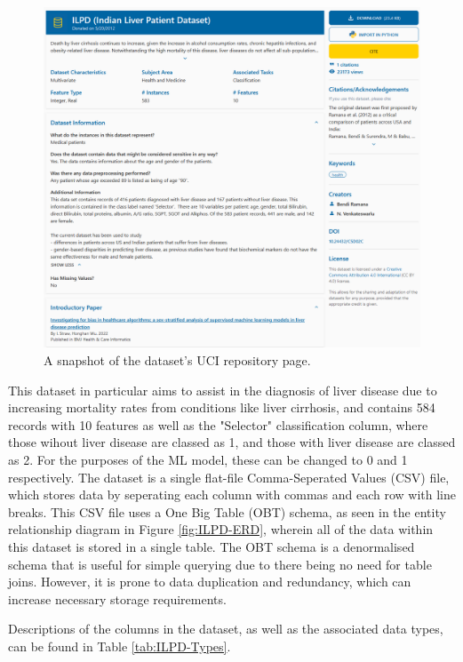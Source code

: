 \documentclass[12pt]{report}
\begin{document}
\begin{figure}[H]
    \centering
    \includegraphics[width=.75\linewidth]{ILPD-UCI.png}
    \caption{A snapshot of the dataset's UCI repository page.}
    \label{fig:ILPD-UCI}
\end{figure}

This dataset in particular aims to assist in the diagnosis of liver
disease due to increasing mortality rates from conditions like liver cirrhosis, and contains 584 records with 10 features
as well as the "Selector" classification column, where those wihout liver disease are classed as 1, and those with liver disease 
are classed as 2. For the purposes of the ML model, these can be changed to 0 and 1 respectively. 
The dataset is a single flat-file Comma-Seperated Values (CSV) file, which stores data by seperating each column with commas
and each row with line breaks. This CSV file uses a One Big Table (OBT) schema, as seen in the entity relationship diagram 
in Figure \ref{fig:ILPD-ERD}, wherein all of the data within this dataset is stored in a single table. 
The OBT schema is a denormalised schema that is useful for simple querying due to there being no need for table joins. 
However, it is prone to data duplication and redundancy, which can increase necessary storage requirements.

Descriptions of the columns in the dataset, as well as the associated data types, can be found in Table \ref{tab:ILPD-Types}.
\end{document}

